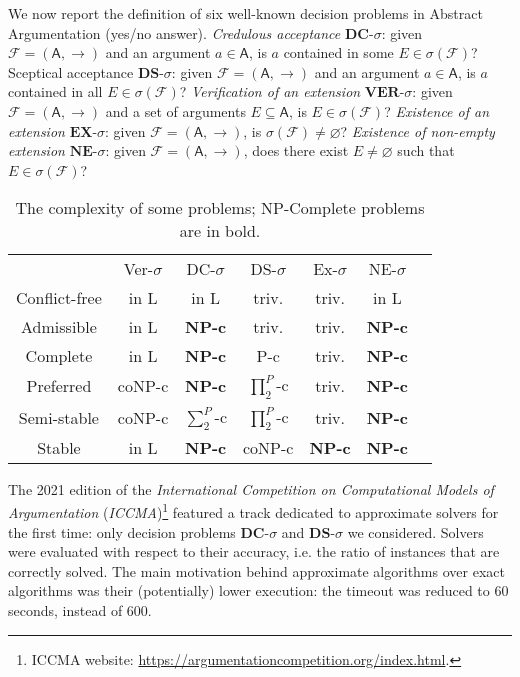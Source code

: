 \documentclass[conference]{IEEEtran}
\newcommand{\AF}{\ensuremath{\mathcal{F}}\xspace} %
\newcommand{\F}{\ensuremath{\mathcal{F}}\xspace} %
\newcommand{\args}{\ensuremath{\mathsf{A}}\xspace} %
\newcommand{\atts}{\ensuremath{\rightarrow}\xspace}
\newcommand{\AFC}{\ensuremath{\AF=(\args,\atts)}\xspace} %
\newcommand{\dc}{\mathbf{DC}}
\newcommand{\ds}{\mathbf{DS}}
\newcommand{\ex}{\mathbf{EX}}
\newcommand{\nem}{\mathbf{NE}}
\begin{document}
We  now report  the definition of six well-known decision problems in Abstract Argumentation (yes/no answer).
\emph{Credulous acceptance} $\dc\textit{-}\sigma$: given \AFC and an argument $a \in \args$, is $a$ contained in some $E \in \sigma(\F)$?
Sceptical acceptance $\ds\textit{-}\sigma$: given \AFC and an argument $a \in \args$, is $a$ contained in all $E \in \sigma(\F)$?
\emph{Verification of an extension} $\mathit{\textbf{VER}}\textit{-}\sigma$: given \AFC and a set of arguments $E \subseteq \args$, is $E \in \sigma(\F)$?
\emph{Existence of an extension} $\ex\textit{-}\sigma$: given \AFC, is
$\sigma(\F) \not= \varnothing$?
\emph{Existence of non-empty extension}
$\nem\textit{-}\sigma$: given \AFC, does there exist $E
\not= \varnothing$ such that $E \in \sigma(\F)$?



\begin{table}[t]
	\centering
	\footnotesize
	\begin{tabular}{ccccccc}
		&  Ver-$\sigma$ &  DC-$\sigma$ & DS-$\sigma$ & Ex-$\sigma$ &
		NE-$\sigma$  \\
		Conflict-free & in L & in L & triv.& triv. & in L  \\
		Admissible & in L  & \bf{NP-c} & triv. & triv. &  \bf{NP-c}  \\
		Complete & in L &  \bf{NP-c} & P-c & triv. &  \bf{NP-c}  \\
		Preferred & coNP-c &  \bf{NP-c} & $\prod^{P}_{2}$-c& triv. &  \bf{NP-c} \\
		Semi-stable & coNP-c & $\sum^{P}_{2}$-c & $\prod^{P}_{2}$-c & triv. &  \bf{NP-c}  \\
		Stable & in L &  \bf{NP-c} & coNP-c &  \bf{NP-c} &  \bf{NP-c} \\
	\end{tabular}
	\caption{The complexity of some  problems; NP-Complete problems are in bold.}
	\label{sec:complexity}
	\vspace{-0.5cm}
\end{table}

\iffalse
The 2021 edition of the \emph{International Competition on Computational Models of Argumentation} (\emph{ICCMA})\footnote{ICCMA website: \url{https://argumentationcompetition.org/index.html}.} featured a track dedicated to approximate solvers for the first time: only  decision problems $\dc$-$\sigma$ and $\ds$-$\sigma$ we considered. Solvers were evaluated with respect to their accuracy, i.e. the ratio of instances that are correctly solved. The main motivation behind approximate algorithms over exact algorithms was their (potentially) lower execution: the timeout was reduced to 60 seconds, instead of 600.
\end{document}
